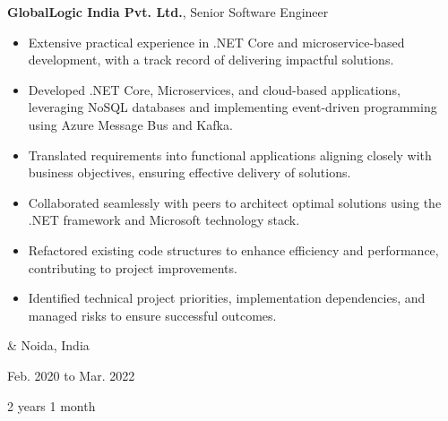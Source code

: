 \documentclass[10pt, letterpaper]{article}
\newenvironment{highlights}{
        \begin{itemize}[
                topsep=0pt,
                parsep=0.10cm,
                partopsep=0pt,
                itemsep=0pt,
                after=\vspace{-1\baselineskip},
                leftmargin=0.4cm + 3pt
            ]
    }{
        \end{itemize}
    } %
\let\originalTabularx\tabularx
\let\originalEndTabularx\endtabularx
\renewenvironment{tabularx}{\bgroup\centering\originalTabularx}{\originalEndTabularx\par\egroup}
\begin{document}
        \vspace{0.2cm}
        \begin{tabularx}{
            \textwidth-0.4 cm-0.13cm
        }{
            K{0.2cm}
            R{4.1cm}
        }
            \textbf{GlobalLogic India Pvt. Ltd.}, Senior Software Engineer

            \vspace{0.10cm}

            \begin{highlights}
                \item Extensive practical experience in .NET Core and microservice-based development, with a track record of delivering impactful solutions.
                \item Developed .NET Core, Microservices, and cloud-based applications, leveraging NoSQL databases and implementing event-driven programming using Azure Message Bus and Kafka.
                \item Translated requirements into functional applications aligning closely with business objectives, ensuring effective delivery of solutions.
                \item Collaborated seamlessly with peers to architect optimal solutions using the .NET framework and Microsoft technology stack.
                \item Refactored existing code structures to enhance efficiency and performance, contributing to project improvements.
                \item Identified technical project priorities, implementation dependencies, and managed risks to ensure successful outcomes.
            \end{highlights}
            &
            Noida, India

            Feb. 2020 to Mar. 2022

            2 years 1 month
        \end{tabularx}
\end{document}
